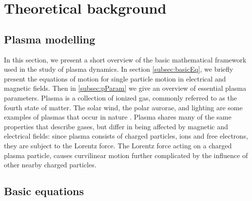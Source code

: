\chapter{Theoretical background}

\label{sec:theory}

\section{Plasma modelling}
In this section, we present a short overview of the basic mathematical framework used in the study of plasma dynamics. In section \cref{subsec:basicEq}, we briefly present the equations of motion for single particle motion in electrical and magnetic fields. Then in \cref{subsec:pParam} we give an overview of essential plasma parameters.
Plasma is a collection of ionized gas, commonly referred to as the fourth state of matter. The solar wind, the polar aurorae, and lighting are some examples of plasmas that occur in nature \parencite{Chen2018}. Plasma shares many of the same properties that describe gases, but differ in being affected by magnetic and electrical fields: since plasma consists of charged particles, ions and free electrons, they are subject to the Lorentz force. The Lorentz force acting on a charged plasma particle, causes curvilinear motion further complicated by the influence of other nearby charged particles.

\section{Basic equations}

